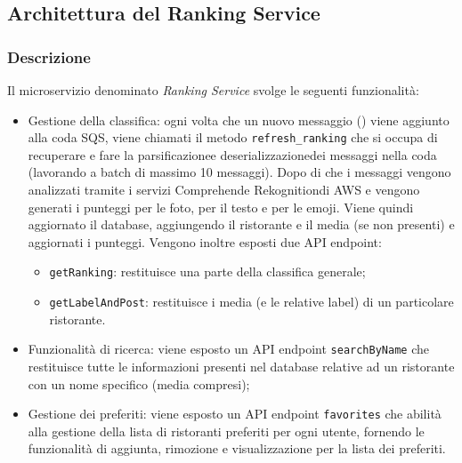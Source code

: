 \subsection{Architettura del Ranking Service}
\subsubsection{Descrizione}
Il microservizio denominato \textit{Ranking Service} svolge le seguenti funzionalità:
\begin{itemize}
	\item Gestione della classifica: ogni volta che un nuovo messaggio () viene aggiunto alla coda SQS, viene chiamati il metodo \texttt{refresh\_ranking} che si occupa di recuperare e fare la parsificazione\glo e deserializzazione\glo dei messaggi nella coda (lavorando a batch di massimo 10 messaggi). Dopo di che i messaggi vengono analizzati tramite i servizi Comprehend\glo e Rekognition\glo di AWS e vengono generati i punteggi per le foto, per il testo e per le emoji. Viene quindi aggiornato il database, aggiungendo il ristorante e il media (se non presenti) e aggiornati i punteggi.
	Vengono inoltre esposti due API endpoint:
		\begin{itemize}
			\item \texttt{getRanking}: restituisce una parte della classifica generale;
			\item \texttt{getLabelAndPost}: restituisce i media (e le relative label\glo) di un particolare ristorante.
		\end{itemize}
	\item Funzionalità di ricerca: viene esposto un API endpoint \texttt{searchByName} che restituisce tutte le informazioni presenti nel database relative ad un ristorante con un nome specifico (media compresi); 
	\item Gestione dei preferiti: viene esposto un API endpoint \texttt{favorites} che abilità alla gestione della lista di ristoranti preferiti per ogni utente, fornendo le funzionalità di aggiunta, rimozione e visualizzazione per la lista dei preferiti.
\end{itemize}

